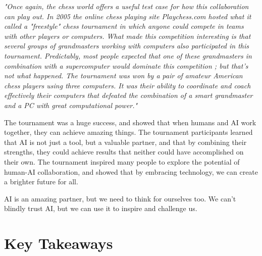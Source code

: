 \textit{"Once again, the chess world offers a useful test case for how this collaboration can play out. In 2005 the online chess playing site Playchess.com hosted what it called a "freestyle" chess tournament in which anyone could compete in teams with other players or computers. What made this competition interesting is that several groups of grandmasters working with computers also participated in this tournament. Predictably, most people expected that one of these grandmasters in combination with a supercomputer would dominate this competition ; but that's not what happened. The tournament was won by a pair of amateur American chess players using three computers. It was their ability to coordinate and coach effectively their computers that defeated the combination of a smart grandmaster and a PC with great computational power."}

The tournament was a huge success, and showed that when humans and AI work together, they can achieve amazing things. The tournament participants learned that AI is not just a tool, but a valuable partner, and that by combining their strengths, they could achieve results that neither could have accomplished on their own. The tournament inspired many people to explore the potential of human-AI collaboration, and showed that by embracing technology, we can create a brighter future for all.

AI is an amazing partner, but we need to think for ourselves too. We can’t blindly trust AI, but we can use it to inspire and challenge us.

\section{Key Takeaways}

